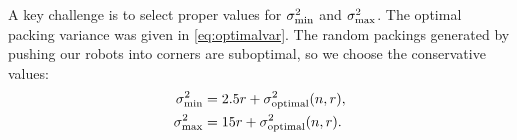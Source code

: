 A key challenge is to select proper values for $\sigma_{\rm{min}}^2$ and $\sigma_{\rm{max}}^2$.  The optimal packing variance was given in \eqref{eq:optimalvar}.
The random packings generated by pushing our robots into corners are suboptimal, so we choose the conservative values: 
\begin{align} \label{eq:sigMaxMin}
 \sigma^2_{\rm{min}} &= 2.5r+ \sigma^2_{\rm{optimal}}(n,r), \nonumber\\
  \sigma^2_{\rm{max}} &= 15r+ \sigma^2_{\rm{optimal}}(n,r).
  \end{align}
















